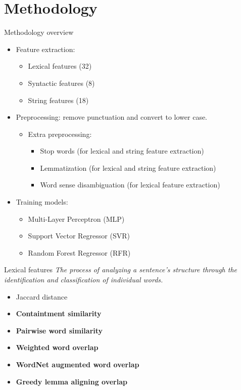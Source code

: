 \section{Methodology}
\frame{\tableofcontents[currentsection]}

\begin{frame}{Methodology overview}
    \begin{itemize}
        \item Feature extraction:
        \begin{itemize}
            \item Lexical features (32)
            \item Syntactic features (8)
            \item String features (18)
        \end{itemize}
        \vspace{0.4cm}
        \item Preprocessing: remove punctuation and convert to lower case.
        \begin{itemize}
            \item Extra preprocessing:
            \begin{itemize}
                \item Stop words (for lexical and string feature extraction)
                \item Lemmatization (for lexical and string feature extraction)
                \item Word sense disambiguation (for lexical feature extraction)
            \end{itemize}
        \end{itemize}
        \vspace{0.4cm}
        \item Training models:
        \begin{itemize}
            \item Multi-Layer Perceptron (MLP)
            \item Support Vector Regressor (SVR)
            \item Random Forest Regressor (RFR)
        \end{itemize} 
    \end{itemize}
\end{frame}


\begin{frame}{Lexical features}
    \textit{The process of analyzing a sentence's structure through the identification and classification of individual words.}
    \vspace{0.5cm}
    \begin{itemize}
        \item Jaccard distance 
        \item \textbf{Containtment similarity}
        \item \textbf{Pairwise word similarity}
        \item \textbf{Weighted word overlap}
        \item \textbf{WordNet augmented word overlap}
        \item \textbf{Greedy lemma aligning overlap}
    \end{itemize}
\end{frame}

